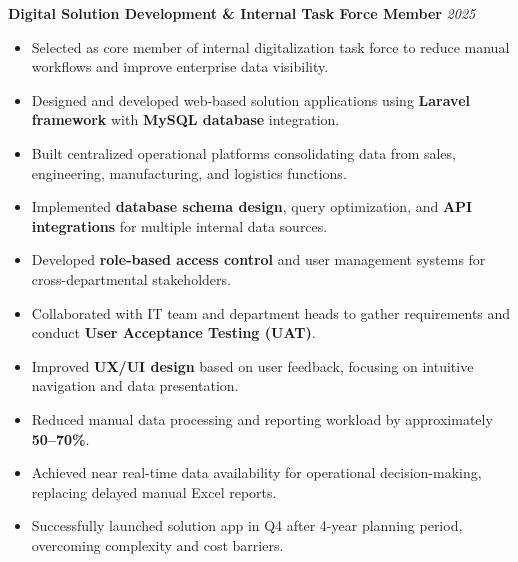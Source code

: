 \documentclass[a4paper,10pt]{article}
\begin{document}
\textbf{Digital Solution Development \& Internal Task Force Member} \hfill \textit{2025}
\begin{itemize}
    \item Selected as core member of internal digitalization task force to reduce manual workflows and improve enterprise data visibility.
    \item Designed and developed web-based solution applications using \textbf{Laravel framework} with \textbf{MySQL database} integration.
    \item Built centralized operational platforms consolidating data from sales, engineering, manufacturing, and logistics functions.
    \item Implemented \textbf{database schema design}, query optimization, and \textbf{API integrations} for multiple internal data sources.
    \item Developed \textbf{role-based access control} and user management systems for cross-departmental stakeholders.
    \item Collaborated with IT team and department heads to gather requirements and conduct \textbf{User Acceptance Testing (UAT)}.
    \item Improved \textbf{UX/UI design} based on user feedback, focusing on intuitive navigation and data presentation.
    \item Reduced manual data processing and reporting workload by approximately \textbf{50–70\%}.
    \item Achieved near real-time data availability for operational decision-making, replacing delayed manual Excel reports.
    \item Successfully launched solution app in Q4 after 4-year planning period, overcoming complexity and cost barriers.
\end{itemize}

\vspace{6pt}
\end{document}
